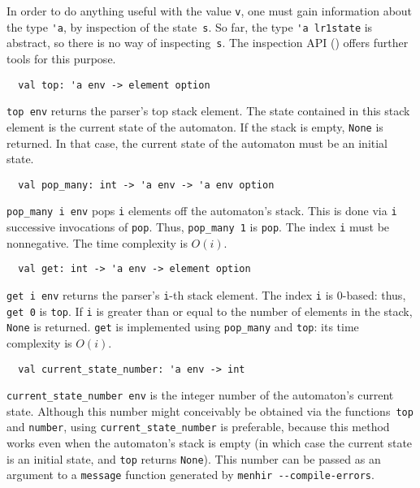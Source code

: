 \documentclass[onecolumn,11pt,nocopyrightspace,preprint]{sigplanconf}
\begin{document}
In order to do anything useful with the value \verb+v+, one must gain
information about the type \verb+'a+, by inspection of the state~\verb+s+. So
far, the type \verb+'a lr1state+ is abstract, so there is no way of
inspecting~\verb+s+. The inspection API () offers further
tools for this purpose.


\begin{verbatim}
  val top: 'a env -> element option
\end{verbatim}

\verb+top env+ returns the parser's top stack element. The state contained in
this stack element is the current state of the automaton. If the stack is
empty, \verb+None+ is returned. In that case, the current state of the
automaton must be an initial state.


\begin{verbatim}
  val pop_many: int -> 'a env -> 'a env option
\end{verbatim}

\verb+pop_many i env+ pops \verb+i+ elements off the automaton's stack. This
is done via \verb+i+ successive invocations of \verb+pop+. Thus,
\verb+pop_many 1+ is \verb+pop+. The index \verb+i+ must be nonnegative. The
time complexity is $O(i)$.


\begin{verbatim}
  val get: int -> 'a env -> element option
\end{verbatim}

\verb+get i env+ returns the parser's \verb+i+-th stack element. The index
\verb+i+ is 0-based: thus, \verb+get 0+ is \verb+top+. If \verb+i+ is greater
than or equal to the number of elements in the stack, \verb+None+ is returned.
\verb+get+ is implemented using \verb+pop_many+ and \verb+top+: its time
complexity is $O(i)$.


\begin{verbatim}
  val current_state_number: 'a env -> int
\end{verbatim}

\verb+current_state_number env+ is the integer number of the automaton's
current state. Although this number might conceivably be obtained via the
functions~\verb+top+ and \verb+number+, using \verb+current_state_number+ is
preferable, because this method works even when the automaton's stack is empty
(in which case the current state is an initial state, and \verb+top+ returns
\verb+None+). This number can be passed as an argument to a \verb+message+
function generated by \verb+menhir --compile-errors+.
\end{document}
